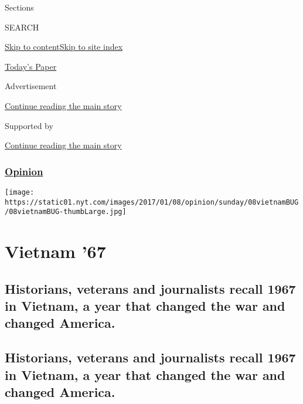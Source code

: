 Sections

SEARCH

\protect\hyperlink{site-content}{Skip to
content}\protect\hyperlink{site-index}{Skip to site index}

\href{https://myaccount.nytimes.com/auth/login?response_type=cookie\&client_id=vi}{}

\href{https://www.nytimes.com/section/todayspaper}{Today's Paper}

Advertisement

\protect\hyperlink{after-top}{Continue reading the main story}

Supported by

\protect\hyperlink{after-sponsor}{Continue reading the main story}

\hypertarget{opinion}{%
\subsubsection{\texorpdfstring{\href{/section/opinion}{Opinion}}{Opinion}}\label{opinion}}

\texttt{[image: https://static01.nyt.com/images/2017/01/08/opinion/sunday/08vietnamBUG/08vietnamBUG-thumbLarge.jpg]}

\hypertarget{vietnam-67}{%
\section{Vietnam '67}\label{vietnam-67}}

\hypertarget{historians-veterans-and-journalists-recall-1967-in-vietnam-a-year-that-changed-the-war-and-changed-america}{%
\subsection{Historians, veterans and journalists recall 1967 in Vietnam,
a year that changed the war and changed
America.}\label{historians-veterans-and-journalists-recall-1967-in-vietnam-a-year-that-changed-the-war-and-changed-america}}

\hypertarget{historians-veterans-and-journalists-recall-1967-in-vietnam-a-year-that-changed-the-war-and-changed-america-1}{%
\subsection{Historians, veterans and journalists recall 1967 in Vietnam,
a year that changed the war and changed
America.}\label{historians-veterans-and-journalists-recall-1967-in-vietnam-a-year-that-changed-the-war-and-changed-america-1}}

